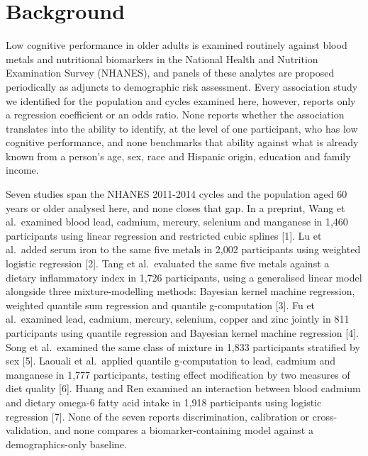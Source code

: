 \documentclass[12pt]{article}
\begin{document}
\section*{Background}

Low cognitive performance in older adults is examined routinely against blood metals and nutritional biomarkers in the National Health and Nutrition Examination Survey (NHANES), and panels of these analytes are proposed periodically as adjuncts to demographic risk assessment. Every association study we identified for the population and cycles examined here, however, reports only a regression coefficient or an odds ratio. None reports whether the association translates into the ability to identify, at the level of one participant, who has low cognitive performance, and none benchmarks that ability against what is already known from a person's age, sex, race and Hispanic origin, education and family income.

Seven studies span the NHANES 2011-2014 cycles and the population aged 60 years or older analysed here, and none closes that gap. In a preprint, Wang et al.\ examined blood lead, cadmium, mercury, selenium and manganese in 1,460 participants using linear regression and restricted cubic splines [1]. Lu et al.\ added serum iron to the same five metals in 2,002 participants using weighted logistic regression [2]. Tang et al.\ evaluated the same five metals against a dietary inflammatory index in 1,726 participants, using a generalised linear model alongside three mixture-modelling methods: Bayesian kernel machine regression, weighted quantile sum regression and quantile g-computation [3]. Fu et al.\ examined lead, cadmium, mercury, selenium, copper and zinc jointly in 811 participants using quantile regression and Bayesian kernel machine regression [4]. Song et al.\ examined the same class of mixture in 1,833 participants stratified by sex [5]. Laouali et al.\ applied quantile g-computation to lead, cadmium and manganese in 1,777 participants, testing effect modification by two measures of diet quality [6]. Huang and Ren examined an interaction between blood cadmium and dietary omega-6 fatty acid intake in 1,918 participants using logistic regression [7]. None of the seven reports discrimination, calibration or cross-validation, and none compares a biomarker-containing model against a demographics-only baseline.
\end{document}
